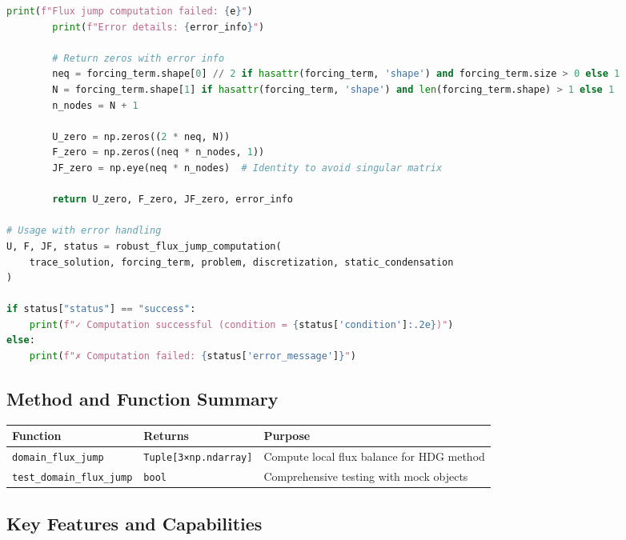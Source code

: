 \begin{lstlisting}[language=Python, caption=Error Handling Example]
        print(f"Flux jump computation failed: {e}")
        print(f"Error details: {error_info}")
        
        # Return zeros with error info
        neq = forcing_term.shape[0] // 2 if hasattr(forcing_term, 'shape') and forcing_term.size > 0 else 1
        N = forcing_term.shape[1] if hasattr(forcing_term, 'shape') and len(forcing_term.shape) > 1 else 1
        n_nodes = N + 1
        
        U_zero = np.zeros((2 * neq, N))
        F_zero = np.zeros((neq * n_nodes, 1))
        JF_zero = np.eye(neq * n_nodes)  # Identity to avoid singular matrix
        
        return U_zero, F_zero, JF_zero, error_info

# Usage with error handling
U, F, JF, status = robust_flux_jump_computation(
    trace_solution, forcing_term, problem, discretization, static_condensation
)

if status["status"] == "success":
    print(f"✓ Computation successful (condition = {status['condition']:.2e})")
else:
    print(f"✗ Computation failed: {status['error_message']}")
\end{lstlisting}

\subsection{Method and Function Summary}
\label{subsec:flux_jump_summary}

\begin{longtable}{|p{4.3cm}|p{3.5cm}|p{6cm}|}
\hline
\textbf{Function} & \textbf{Returns} & \textbf{Purpose} \\
\hline
\endhead

\texttt{domain\_flux\_jump} & \texttt{Tuple[3×np.ndarray]} & Compute local flux balance for HDG method \\
\hline

\texttt{test\_domain\_flux\_jump} & \texttt{bool} & Comprehensive testing with mock objects \\
\hline

\end{longtable}

\subsection{Key Features and Capabilities}


